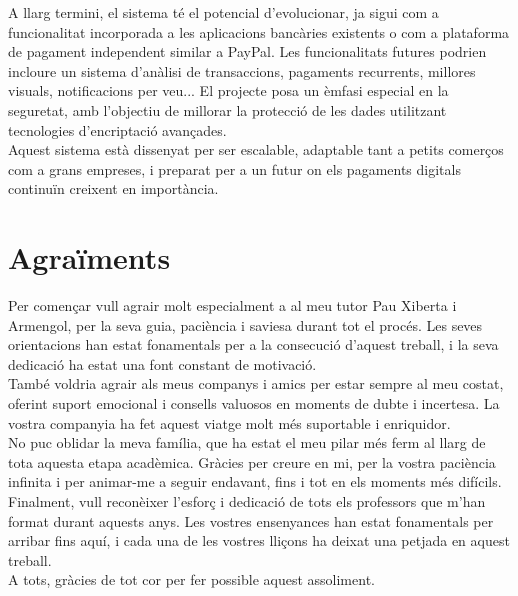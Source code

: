 \documentclass[a4paper,12pt,twoside]{ThesisStyle}
\begin{document}
A llarg termini, el sistema té el potencial d'evolucionar, ja sigui com a funcionalitat incorporada a les aplicacions bancàries existents o com a plataforma de pagament independent similar a PayPal. Les funcionalitats futures podrien incloure un sistema d'anàlisi de transaccions, pagaments recurrents, millores visuals, notificacions per veu... El projecte posa un èmfasi especial en la seguretat, amb l'objectiu de millorar la protecció de les dades utilitzant tecnologies d'encriptació avançades.\\

Aquest sistema està dissenyat per ser escalable, adaptable tant a petits comerços com a grans empreses, i preparat per a un futur on els pagaments digitals continuïn creixent en importància.





\chapter*{Agraïments}
\label{chp:agraiments}

Per començar vull agrair molt especialment a al meu tutor Pau Xiberta i Armengol, per la seva guia, paciència i saviesa durant tot el procés. Les seves orientacions han estat fonamentals per a la consecució d’aquest treball, i la seva dedicació ha estat una font constant de motivació.\\

També voldria agrair als meus companys i amics per estar sempre al meu costat, oferint suport emocional i consells valuosos en moments de dubte i incertesa. La vostra companyia ha fet aquest viatge molt més suportable i enriquidor.\\

No puc oblidar la meva família, que ha estat el meu pilar més ferm al llarg de tota aquesta etapa acadèmica. Gràcies per creure en mi, per la vostra paciència infinita i per animar-me a seguir endavant, fins i tot en els moments més difícils.\\

Finalment, vull reconèixer l’esforç i dedicació de tots els professors que m’han format durant aquests anys. Les vostres ensenyances han estat fonamentals per arribar fins aquí, i cada una de les vostres lliçons ha deixat una petjada en aquest treball.\\

A tots, gràcies de tot cor per fer possible aquest assoliment.


\tableofcontents
\end{document}
